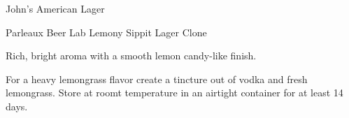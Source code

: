 \begin{recipe}{John's American Lager}
\begin{ingredientsblock}
\end{ingredientsblock}

\begin{recipe}{Parleaux Beer Lab Lemony Sippit Lager Clone} %

\begin{aboutblock}
Rich, bright aroma with a smooth lemon candy-like finish. \sourceaha
\end{aboutblock}


\begin{methodandtiming}
  
\begin{mashsteps}
\end{mashsteps}

\begin{fermentationsteps}
\end{fermentationsteps}

\begin{directions}
For a heavy lemongrass flavor create a tincture out of  vodka
and  fresh lemongrass. Store at roomt temperature in an
airtight container for at least 14 days.
\end{directions}

\end{methodandtiming}

\recipebreak

\begin{ingredientsblock}

\begin{malts}
\end{malts}

\begin{hops}
\end{hops}


\end{ingredientsblock}
\end{recipe}
\end{recipe}
